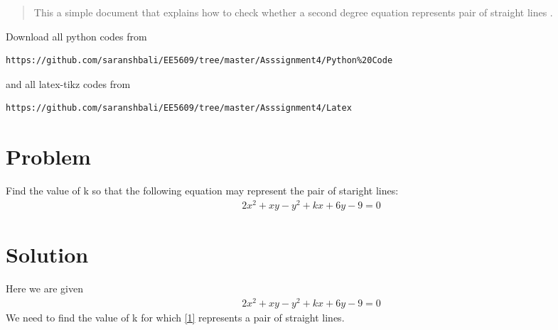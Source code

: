 \documentclass[journal,12pt,twocolumn]{IEEEtran}
\begin{document}
%
\begin{abstract}
This a simple document that explains how to check whether a second degree equation represents pair of straight lines .
\end{abstract}
Download all python codes from 
%
\begin{lstlisting}
https://github.com/saranshbali/EE5609/tree/master/Asssignment4/Python%20Code
\end{lstlisting}
%
and all latex-tikz codes from 
%
\begin{lstlisting}
https://github.com/saranshbali/EE5609/tree/master/Asssignment4/Latex
\end{lstlisting}
%
\section{Problem} Find the value of k so that the following equation may represent the pair of staright lines:
\begin{align}
	2x^2+ xy -y^2 + kx + 6y - 9 = 0 
\end{align}
\section{Solution}
Here we are given 
\begin{align}
	2x^2+ xy -y^2 + kx + 6y - 9 = 0 \label{1} 
\end{align}
We need to find the value of k for which \eqref{1} represents a pair of straight lines.
\end{document}
